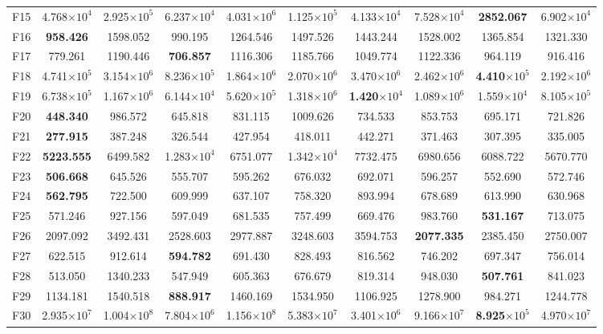 \begin{table}[t]
\begin{tabular}{cccccccccc}
F15 & 4.768$\times10^{4}$ & 2.925$\times10^{5}$ & 6.237$\times10^{4}$ & 4.031$\times10^{6}$ & 1.125$\times10^{5}$ & 4.133$\times10^{4}$ & 7.528$\times10^{4}$ & \textbf{2852.067} & 6.902$\times10^{4}$ \\
F16 & \textbf{958.426} & 1598.052 & 990.195 & 1264.546 & 1497.526 & 1443.244 & 1528.002 & 1365.854 & 1321.330 \\
F17 & 779.261 & 1190.446 & \textbf{706.857} & 1116.306 & 1185.766 & 1049.774 & 1122.336 & 964.119 & 916.416 \\
F18 & 4.741$\times10^{5}$ & 3.154$\times10^{6}$ & 8.236$\times10^{5}$ & 1.864$\times10^{6}$ & 2.070$\times10^{6}$ & 3.470$\times10^{6}$ & 2.462$\times10^{6}$ & \textbf{4.410$\times10^{5}$} & 2.192$\times10^{6}$ \\
F19 & 6.738$\times10^{5}$ & 1.167$\times10^{6}$ & 6.144$\times10^{4}$ & 5.620$\times10^{5}$ & 1.318$\times10^{6}$ & \textbf{1.420$\times10^{4}$} & 1.089$\times10^{6}$ & 1.559$\times10^{4}$ & 8.105$\times10^{5}$ \\
F20 & \textbf{448.340} & 986.572 & 645.818 & 831.115 & 1009.626 & 734.533 & 853.753 & 695.171 & 721.826 \\
F21 & \textbf{277.915} & 387.248 & 326.544 & 427.954 & 418.011 & 442.271 & 371.463 & 307.395 & 335.005 \\
F22 & \textbf{5223.555} & 6499.582 & 1.283$\times10^{4}$ & 6751.077 & 1.342$\times10^{4}$ & 7732.475 & 6980.656 & 6088.722 & 5670.770 \\
F23 & \textbf{506.668} & 645.526 & 555.707 & 595.262 & 676.032 & 692.071 & 596.257 & 552.690 & 572.746 \\
F24 & \textbf{562.795} & 722.500 & 609.999 & 637.107 & 758.320 & 893.994 & 678.689 & 613.990 & 630.968 \\
F25 & 571.246 & 927.156 & 597.049 & 681.535 & 757.499 & 669.476 & 983.760 & \textbf{531.167} & 713.075 \\
F26 & 2097.092 & 3492.431 & 2528.603 & 2977.887 & 3248.603 & 3594.753 & \textbf{2077.335} & 2385.450 & 2750.007 \\
F27 & 622.515 & 912.614 & \textbf{594.782} & 691.430 & 828.493 & 816.562 & 746.202 & 697.347 & 756.014 \\
F28 & 513.050 & 1340.233 & 547.949 & 605.363 & 676.679 & 819.314 & 948.030 & \textbf{507.761} & 841.023 \\
F29 & 1134.181 & 1540.518 & \textbf{888.917} & 1460.169 & 1534.950 & 1106.925 & 1278.900 & 984.271 & 1244.778 \\
F30 & 2.935$\times10^{7}$ & 1.004$\times10^{8}$ & 7.804$\times10^{6}$ & 1.156$\times10^{8}$ & 5.383$\times10^{7}$ & 3.401$\times10^{6}$ & 9.166$\times10^{7}$ & \textbf{8.925$\times10^{5}$} & 4.970$\times10^{7}$ \\
\hline
\end{tabular}
\end{table}